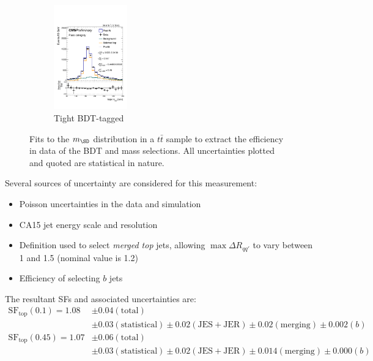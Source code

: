 \begin{figure}[]
\begin{center}
\begin{subfigure}[t]{\textwidth}
\begin{center}
            \includegraphics[width=0.35\textwidth]{figures/toptagging/sf/tight_pass.pdf}
            \caption{Tight BDT-tagged}
    \end{center}
        \end{subfigure}
        \caption{Fits to the $m_\SD$ distribution in a $t\bar{t}$ sample to extract the efficiency in data of the BDT and mass selections.
                 All uncertainties plotted and quoted are statistical in nature.}
        \label{fig:jets:sffits}
    \end{center}
\end{figure}

Several sources of uncertainty are considered for this measurement:
\begin{itemize}
    \item Poisson uncertainties in the data and simulation 
    \item CA15 jet energy scale and resolution 
    \item Definition used to select \emph{merged top} jets, allowing $\max \Delta R_{qq'}$ to vary between 1 and 1.5 (nominal value is 1.2)
    \item Efficiency of selecting $b$ jets
\end{itemize}
The resultant SFs and associated uncertainties are:
\begin{align}
    \mathrm{SF}_\mathrm{top}(0.1) = 1.08 & \pm 0.04 (\mathrm{total}) \nonumber \\ 
                                         & \pm 0.03 (\mathrm{statistical}) \pm 0.02 (\mathrm{JES+JER}) \pm 0.02 (\mathrm{merging}) \pm 0.002 (b) \nonumber \\ 
    \mathrm{SF}_\mathrm{top}(0.45) = 1.07 & \pm 0.06 (\mathrm{total}) \nonumber \\ 
                                         & \pm 0.03 (\mathrm{statistical}) \pm 0.02 (\mathrm{JES+JER}) \pm 0.014 (\mathrm{merging}) \pm 0.000 (b) 
\end{align}

